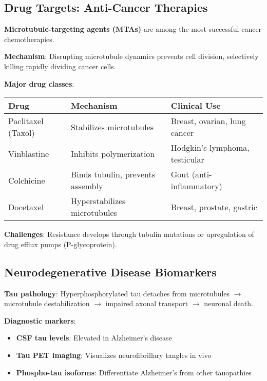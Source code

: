 \subsection{Drug Targets: Anti-Cancer Therapies}
\label{subsec:cancer-drugs}

\textbf{Microtubule-targeting agents (MTAs)} are among the most successful cancer chemotherapies.

\textbf{Mechanism}: Disrupting microtubule dynamics prevents cell division, selectively killing rapidly dividing cancer cells.

\textbf{Major drug classes}:

\begin{center}
\begin{tabular}{@{}lll@{}}
\toprule
\textbf{Drug} & \textbf{Mechanism} & \textbf{Clinical Use} \\
\midrule
Paclitaxel (Taxol) & Stabilizes microtubules & Breast, ovarian, lung cancer \\
Vinblastine & Inhibits polymerization & Hodgkin's lymphoma, testicular \\
Colchicine & Binds tubulin, prevents assembly & Gout (anti-inflammatory) \\
Docetaxel & Hyperstabilizes microtubules & Breast, prostate, gastric \\
\bottomrule
\end{tabular}
\end{center}

\textbf{Challenges}: Resistance develops through tubulin mutations or upregulation of drug efflux pumps (P-glycoprotein).

\subsection{Neurodegenerative Disease Biomarkers}
\label{subsec:neurodegen-biomarkers}

\textbf{Tau pathology}: Hyperphosphorylated tau detaches from microtubules $\rightarrow$ microtubule destabilization $\rightarrow$ impaired axonal transport $\rightarrow$ neuronal death.

\textbf{Diagnostic markers}:
\begin{itemize}
\item \textbf{CSF tau levels}: Elevated in Alzheimer's disease
\item \textbf{Tau PET imaging}: Visualizes neurofibrillary tangles in vivo
\item \textbf{Phospho-tau isoforms}: Differentiate Alzheimer's from other tauopathies
\end{itemize}

